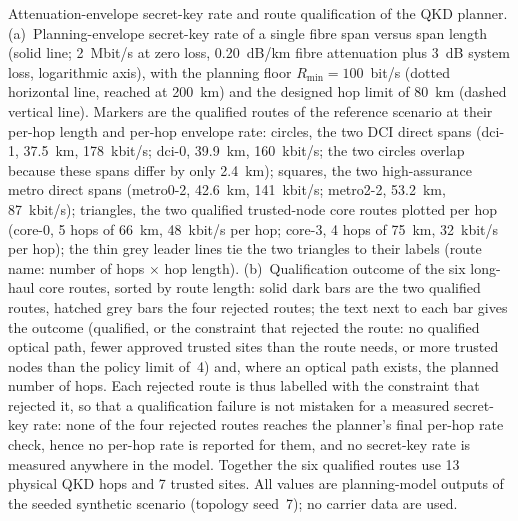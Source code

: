 Attenuation-envelope secret-key rate and route qualification of the QKD
planner. (a)~Planning-envelope secret-key rate of a single fibre span versus
span length (solid line; 2~Mbit/s at zero loss, 0.20~dB/km fibre attenuation
plus 3~dB system loss, logarithmic axis), with the planning floor
$R_{\min} = 100$~bit/s (dotted horizontal line, reached at 200~km) and the
designed hop limit of 80~km (dashed vertical line). Markers are the qualified
routes of the reference scenario at their per-hop length and per-hop envelope
rate: circles, the two DCI direct spans (dci-1, 37.5~km, 178~kbit/s; dci-0,
39.9~km, 160~kbit/s; the two circles overlap because these spans differ by
only 2.4~km); squares, the two high-assurance metro direct spans
(metro0-2, 42.6~km, 141~kbit/s; metro2-2, 53.2~km, 87~kbit/s); triangles, the
two qualified trusted-node core routes plotted per hop (core-0, 5 hops of
66~km, 48~kbit/s per hop; core-3, 4 hops of 75~km, 32~kbit/s per hop); the
thin grey leader lines tie the two triangles to their labels (route name:
number of hops $\times$ hop length). (b)~Qualification outcome of the six
long-haul core routes, sorted by route length: solid dark bars are the two
qualified routes, hatched grey bars the four rejected routes; the text next
to each bar gives the outcome (qualified, or the constraint that rejected the
route: no qualified optical path, fewer approved trusted sites than the route
needs, or more trusted nodes than the policy limit of~4) and, where an
optical path exists, the planned number of hops. Each rejected route is thus
labelled with the constraint that rejected it, so that a qualification
failure is not mistaken for a measured secret-key rate: none of the four
rejected routes reaches the planner's final per-hop rate check, hence no
per-hop rate is reported for them, and no secret-key rate is measured
anywhere in the model. Together the six qualified routes use 13 physical QKD
hops and 7 trusted sites. All values are planning-model outputs of the seeded
synthetic scenario (topology seed~7); no carrier data are used.
